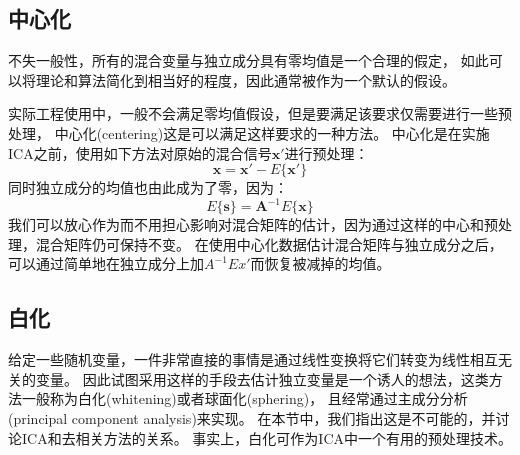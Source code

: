\subsection{中心化}
不失一般性，所有的混合变量与独立成分具有零均值是一个合理的假定，
如此可以将理论和算法简化到相当好的程度，因此通常被作为一个默认的假设。

实际工程使用中，一般不会满足零均值假设，但是要满足该要求仅需要进行一些预处理，
中心化(centering)这是可以满足这样要求的一种方法。
中心化是在实施ICA之前，使用如下方法对原始的混合信号$\bm{x'}$进行预处理：
\begin{equation} 
\bm{x=x'}-E\{\bm{x'}\}
\end{equation}
同时独立成分的均值也由此成为了零，因为：
\begin{equation}
E\{\bm{s}\}=\bm{A}^{-1}E\{\bm{x}\}
\end{equation}
我们可以放心作为而不用担心影响对混合矩阵的估计，因为通过这样的中心和预处理，混合矩阵仍可保持不变。
在使用中心化数据估计混合矩阵与独立成分之后，
可以通过简单地在独立成分上加$A^{-1}E{x'}$而恢复被减掉的均值。

\subsection{白化}
给定一些随机变量，一件非常直接的事情是通过线性变换将它们转变为线性相互无关的变量。
因此试图采用这样的手段去估计独立变量是一个诱人的想法，这类方法一般称为白化(whitening)或者球面化(sphering)，
且经常通过主成分分析(principal component analysis)来实现。
在本节中，我们指出这是不可能的，并讨论ICA和去相关方法的关系。
事实上，白化可作为ICA中一个有用的预处理技术。

